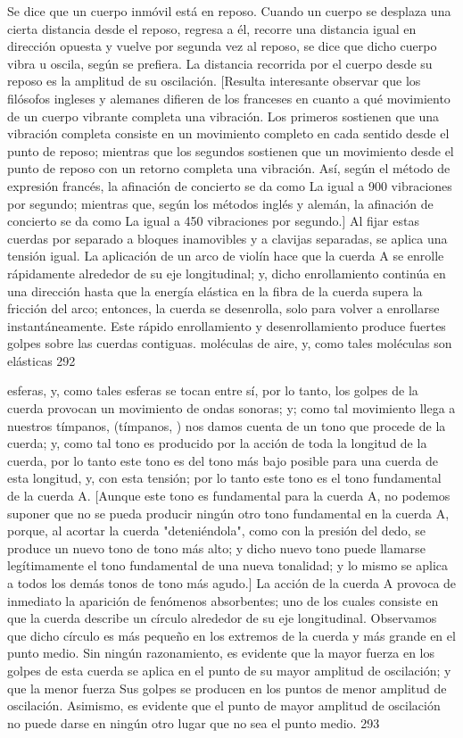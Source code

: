 Se dice que un cuerpo inmóvil está en reposo. Cuando un cuerpo se desplaza una cierta distancia desde el reposo, regresa a él, recorre una distancia igual en dirección opuesta y vuelve por segunda vez al reposo, se dice que dicho cuerpo vibra u oscila, según se prefiera. La distancia recorrida por el cuerpo desde su reposo es la amplitud de su oscilación.
[Resulta interesante observar que los filósofos ingleses y alemanes difieren de los franceses en cuanto a qué movimiento de un cuerpo vibrante completa una vibración. Los primeros sostienen que una vibración completa consiste en un movimiento completo en cada sentido desde el punto de reposo; mientras que los segundos sostienen que un movimiento desde el punto de reposo con un retorno completa una vibración. Así, según el método de expresión francés, la afinación de concierto se da como La igual a 900 vibraciones por segundo; mientras que, según los métodos inglés y alemán, la afinación de concierto se da como La igual a 450 vibraciones por segundo.]
Al fijar estas cuerdas por separado a bloques inamovibles y a clavijas separadas, se aplica una tensión igual. La aplicación de un arco de violín hace que la cuerda A se enrolle rápidamente alrededor de su eje longitudinal; y, dicho enrollamiento continúa en una dirección hasta que la energía elástica en la fibra de la cuerda supera la fricción del arco; entonces, la cuerda se desenrolla, solo para volver a enrollarse instantáneamente. Este rápido enrollamiento y desenrollamiento produce fuertes golpes sobre las cuerdas contiguas.
moléculas de aire, y, como tales moléculas son elásticas
292

esferas, y, como tales esferas se tocan entre sí, por lo tanto, los golpes de la cuerda provocan un movimiento de ondas sonoras; y; como tal movimiento llega a nuestros tímpanos, (tímpanos, ) nos damos cuenta de un tono que procede de la cuerda; y, como tal tono es producido por la acción de toda la longitud de la cuerda, por lo tanto este tono es del tono más bajo posible para una cuerda de esta longitud, y, con esta tensión; por lo tanto este tono es el tono fundamental de la cuerda A.
[Aunque este tono es fundamental para la cuerda A, no podemos suponer que no se pueda producir ningún otro tono fundamental en la cuerda A, porque, al acortar la cuerda "deteniéndola", como con la presión del dedo, se produce un nuevo tono de tono más alto; y dicho nuevo tono puede llamarse legítimamente el tono fundamental de una nueva tonalidad; y lo mismo se aplica a todos los demás tonos de
tono más agudo.]
La acción de la cuerda A provoca de inmediato la aparición de fenómenos absorbentes; uno de los cuales consiste en que la cuerda describe un círculo alrededor de su eje longitudinal. Observamos que dicho círculo es más pequeño en los extremos de la cuerda y más grande en el punto medio. Sin ningún razonamiento, es evidente que la mayor fuerza en los golpes de esta cuerda se aplica en el punto de su mayor amplitud de oscilación; y que la menor fuerza
Sus golpes se producen en los puntos de menor amplitud de oscilación. Asimismo, es evidente que el punto de mayor amplitud de oscilación no puede darse en ningún otro lugar que no sea el punto medio.
293

